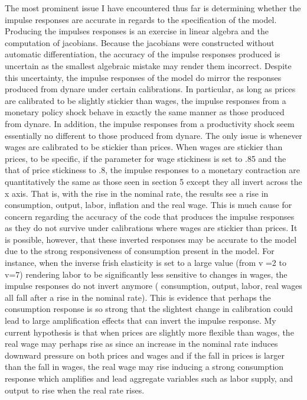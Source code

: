 \documentclass[titlepage]{\econtex}\providecommand{\texname}{BufferStockTheory}
\begin{document}
The most prominent issue I have encountered thus far is determining whether the impulse responses are accurate in regards to the specification of the model. Producing the impulses responses is an exercise in linear algebra and the computation of jacobians. Because the jacobians were constructed without automatic differentiation, the accuracy of the impulse responses produced is uncertain as the smallest algebraic mistake may render them incorrect. Despite this uncertainty, the impulse responses of the model do mirror the responses produced from dynare under certain calibrations.  In particular, as long as prices are calibrated to be slightly stickier than wages, the impulse responses from a monetary policy shock behave in exactly the same manner as those produced from dynare. In addition, the impulse responses from a productivity shock seem essentially no different to those produced from dynare. The only issue is whenever wages are calibrated to be stickier than prices. When wages are stickier than prices,  to be specific, if the parameter for wage stickiness is set to .85 and the that of price stickiness to .8, the impulse responses to a monetary contraction are quantitatively the same as those seen in section 5 except they all invert across the x axis. That is, with the rise in the nominal rate, the results see a rise in consumption, output, labor, inflation and the real wage. This is much cause for concern regarding the accuracy of the code that produces the impulse responses as they do not survive under calibrations where wages are stickier than prices. It is possible, however, that these inverted responses may be accurate to the model due to the strong responsiveness of consumption present in the model. For instance, when the inverse frish elasticity is set to a large value (from v =2 to v=7) rendering labor to be significantly less sensitive to changes in wages, the impulse responses do not invert anymore ( consumption, output, labor, real wages all fall after a rise in the nominal rate). This is evidence that perhaps the consumption response is so strong that the slightest change in calibration could lead to large amplification effects that can invert the impulse response. My current hypothesis is that when prices are slightly more flexible than wages, the real wage may perhaps rise as since an increase in the nominal rate induces downward pressure on both prices and wages and if the fall in prices is larger than the fall in wages, the real wage may rise inducing a strong consumption response which amplifies and lead aggregate variables such as labor supply, and output to rise when the real rate rises. 
\end{document}
